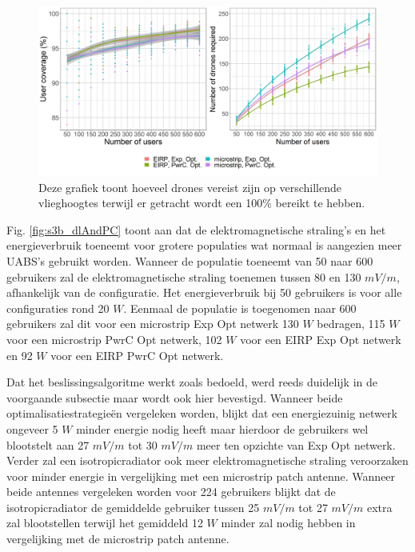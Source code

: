 \documentclass[twocolumn]{phdsymp_dutch}
\begin{document}
\begin{figure}[h]
  \includegraphics[width=\linewidth]{../results/s3/uvsnumdronesAndCov.png}
  \caption{Deze grafiek toont hoeveel drones vereist zijn op verschillende vlieghoogtes terwijl er getracht wordt een 100\% bereikt te hebben.}
  \label{fig:s3b_numdronesAndCov}
\end{figure}

Fig. \ref{fig:s3b_dlAndPC} toont aan dat de elektromagnetische straling's en het energieverbruik toeneemt voor grotere populaties wat normaal is aangezien meer \gls{UABS}'s
gebruikt worden. Wanneer de populatie toeneemt van 50 naar 600 gebruikers zal 
de elektromagnetische straling toenemen tussen 80 en 130 $mV/m$, afhankelijk van de configuratie. 
Het energieverbruik bij 50 gebruikers is voor alle configuraties rond 20 $W$.
Eenmaal de populatie is toegenomen naar 600 gebruikers zal dit voor een
microstrip \gls{Exp Opt} netwerk 130 $W$ bedragen, 115 $W$ voor een microstrip \gls{PwrC Opt} netwerk,
102 $W$ voor een \gls{EIRP} \gls{Exp Opt} netwerk en 92 $W$ voor een  \gls{EIRP} \gls{PwrC Opt} netwerk.

Dat het beslissingsalgoritme werkt zoals bedoeld, werd reeds duidelijk in de voorgaande subsectie maar wordt
ook hier bevestigd. Wanneer beide optimalisatiestrategieën vergeleken worden,
blijkt dat een energiezuinig netwerk ongeveer 5 $W$ minder energie nodig heeft maar hierdoor de gebruikers wel 
blootstelt aan 27 $mV/m$ tot 30 $mV/m$ meer ten opzichte van \gls{Exp Opt} netwerk.
Verder zal een \gls{isotropicradiator} ook meer elektromagnetische straling veroorzaken 
voor minder energie in vergelijking met een microstrip patch antenne.
Wanneer beide antennes vergeleken worden voor 224 gebruikers blijkt 
dat de \gls{isotropicradiator} de gemiddelde gebruiker tussen 
 25 $mV/m$ tot 27 $mV/m$ extra zal blootstellen
 terwijl het gemiddeld 12 $W$ minder zal nodig hebben in vergelijking met de microstrip patch antenne.
\end{document}
